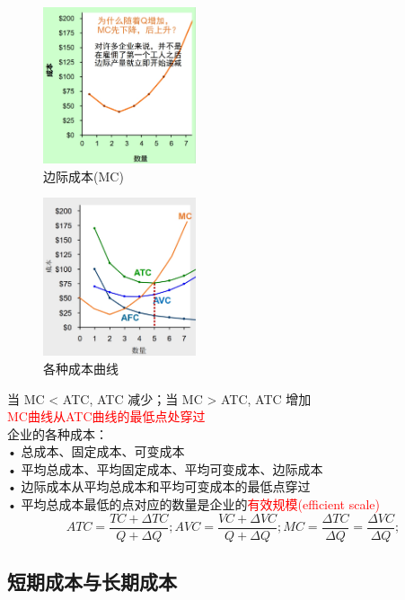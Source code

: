 \documentclass[12pt,a4paper]{article}
\begin{document}
\begin{figure}[H] 
  \centering %
  \includegraphics[width=0.4\textwidth]{MC.png} 
  \caption{边际成本(MC)} %
\end{figure}

\begin{figure}[H] 
  \centering %
  \includegraphics[width=0.4\textwidth]{各种成本曲线.png} 
  \caption{各种成本曲线} %
\end{figure}
当 MC < ATC, ATC 减少；当 MC > ATC, ATC 增加\\
\indent \textcolor{red}{MC曲线从ATC曲线的最低点处穿过}\\


企业的各种成本：\\
• 总成本、固定成本、可变成本\\
• 平均总成本、平均固定成本、平均可变成本、边际成本\\
• 边际成本从平均总成本和平均可变成本的最低点穿过\\
• 平均总成本最低的点对应的数量是企业的\textcolor{red}{有效规模(efficient scale)}\\
\[
ATC = \frac{TC + \Delta TC}{Q + \Delta Q};
AVC = \frac{VC + \Delta VC}{Q+ \Delta Q };
MC = \frac{\Delta TC}{\Delta Q } = \frac{\Delta VC}{\Delta Q };
\]
\subsection{短期成本与长期成本}
\end{document}
